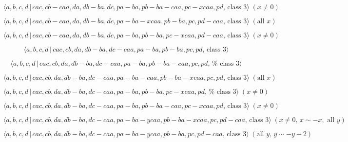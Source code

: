 \documentclass[10pt]{article}
\begin{document}
\begin{equation}
\langle a,b,c,d\,|\,cac,cb-caa,da,db-ba,dc,pa-ba,pb-ba-caa,pc-xcaa,pd,\,%
\text{class }3\rangle \;(x \neq 0)  \tag{7.4272}
\end{equation}

\begin{equation}
\langle a,b,c,d\,|\,cac,cb-caa,da,db-ba,dc,pa-ba-xcaa,pb-ba,pc,pd-caa,\,%
\text{class }3\rangle \;(\text{all }x)  \tag{7.4273}
\end{equation}

\begin{equation}
\langle a,b,c,d\,|\,cac,cb-caa,da,db-ba,dc,pa-ba,pb-ba,pc-xcaa,pd-caa,\,%
\text{class }3\rangle \;(x \neq 0)  \tag{7.4274}
\end{equation}

\begin{equation}
\langle a,b,c,d\,|\,cac,cb,da,db-ba,dc-caa,pa-ba,pb-ba,pc,pd,\,\text{class }%
3\rangle  \tag{7.4275}
\end{equation}

\begin{equation}
\langle a,b,c,d\,|\,cac,cb,da,db-ba,dc-caa,pa-ba,pb-ba-caa,pc,pd,\,\text{%
class }3\rangle  \tag{7.4276}
\end{equation}

\begin{equation}
\langle a,b,c,d\,|\,cac,cb,da,db-ba,dc-caa,pa-ba-caa,pb-ba-xcaa,pc,pd,\,%
\text{class }3\rangle \;(\text{all }x)  \tag{7.4277}
\end{equation}

\begin{equation}
\langle a,b,c,d\,|\,cac,cb,da,db-ba,dc-caa,pa-ba,pb-ba,pc-xcaa,pd,\,\text{%
class }3\rangle \;(x \neq 0)  \tag{7.4278}
\end{equation}

\begin{equation}
\langle a,b,c,d\,|\,cac,cb,da,db-ba,dc-caa,pa-ba,pb-ba-caa,pc-xcaa,pd,\,%
\text{class }3\rangle \;(x \neq 0)  \tag{7.4279}
\end{equation}

\begin{equation}
\langle a,b,c,d\,|\,cac,cb,da,db-ba,dc-caa,pa-ba-ycaa,pb-ba-xcaa,pc,pd-caa,\,%
\text{class }3\rangle \;(x\neq 0,\,x\sim -x,\text{ all }y)  \tag{7.4280}
\end{equation}

\begin{equation}
\langle a,b,c,d\,|\,cac,cb,da,db-ba,dc-caa,pa-ba-ycaa,pb-ba,pc,pd-caa,\,%
\text{class }3\rangle \;(\text{all }y,\,y\sim -y-2)  \tag{7.4281}
\end{equation}
\end{document}
